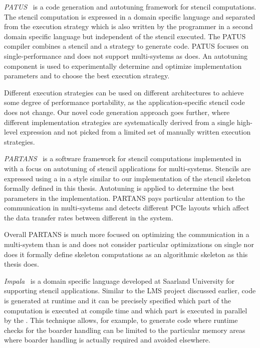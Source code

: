 \bigskip

\emph{{\small PATUS}}~\cite{ChristenSB11} is a code generation and autotuning framework for stencil computations.
The stencil computation is expressed in a domain specific language and separated from the execution strategy which is also written by the programmer in a second domain specific language but independent of the stencil executed.
The {\small PATUS} compiler combines a stencil and a strategy to generate \OpenCL code.
{\small PATUS} focuses on single-\GPU performance and does not support multi-\GPU systems as \SkelCL does.
An autotuning component is used to experimentally determine and optimize implementation parameters and to choose the best execution strategy.

Different execution strategies can be used on different architectures to achieve some degree of performance portability, as the application-specific stencil code does not change.
Our novel code generation approach goes further, where different implementation strategies are systematically derived from a single high-level expression and not picked from a limited set of manually written execution strategies.

\bigskip

\emph{{\small PARTANS}}~\cite{LutzFC13} is a software framework for stencil computations implemented in \Cpp with a focus on autotuning of stencil applications for multi-\GPU systems.
Stencils are expressed using a \Cpp \API in a style similar to our \SkelCL \Cpp implementation of the stencil skeleton formally defined in this thesis.
Autotuning is applied to determine the best parameters in the implementation.
{\small PARTANS} pays particular attention to the communication in multi-\GPU systems and detects different PCIe layouts which affect the data transfer rates between different \GPUs in the system.

Overall {\small PARTANS} is much more focused on optimizing the communication in a multi-\GPU system than \SkelCL is and does not consider particular optimizations on single \GPUs nor does it formally define skeleton computations as an algorithmic skeleton as this thesis does.

\bigskip
\emph{Impala}~\cite{KosterLHMS14} is a domain specific language developed at Saarland University for supporting stencil applications.
Similar to the {\small LMS} project discussed earlier, code is generated at runtime and it can be precisely specified which part of the computation is executed at compile time and which part is executed in parallel by the \GPU.
This technique allows, for example, to generate \GPU code where runtime checks for the boarder handling can be limited to the particular memory areas where boarder handling is actually required and avoided elsewhere.

